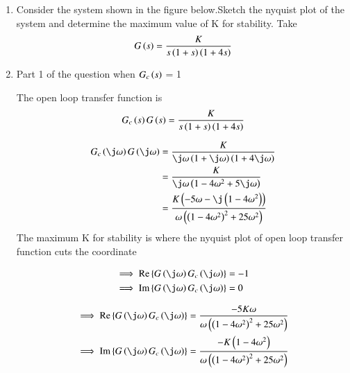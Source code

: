 \begin{enumerate}[label=\thesubsection.\arabic*.,ref=\thesubsection.\theenumi]

\item Consider the system shown in the figure below.Sketch the nyquist plot of the system and determine the maximum value of K for stability.
Take  
\begin{align}
G\brak{s} = \frac{K}{s\brak{1+s}\brak{1+4s}}
\label{eq:ee18btech11034_Gs}
\end{align}

\begin{figure}[!ht]
	\begin{center}
		
		\resizebox{\columnwidth}{!}{}
	\end{center}
\caption{}
\label{fig:ee18btech11034}
\end{figure}

\solution
\item Part 1 of the question when $G_{c}\left(s\right)$ = 1

The open loop transfer function is 
\begin{align}
    G_{c}\left(s\right)G\left(s\right) = \frac{K}{s\left(1+s\right)\left(1+4s\right)}
\end{align}

\begin{align}
    G_{c}\brak{\j\omega}G\brak{\j\omega} &= \frac{K}{{\j\omega}\brak{1+\j\omega}\brak{1+4\j\omega}}
    \\
    &= \frac{K}{{\j\omega}\brak{1-4\omega^2+5\j\omega}}
    \\
    &= \frac{K\brak{-5\omega-\j\brak{1-4\omega^2}}}{{\omega}\brak{\brak{1-4\omega^2}^2+25\omega^2}}
    \end{align}
The maximum K for stability is where the nyquist plot of open loop transfer function cuts the coordinate 


\begin{align}
 \implies    \text{Re} \cbrak{G\brak{\j \omega}G_{c}\brak{\j\omega}} &= -1
 \label{eq:ee18btech11034_eq_Re}
 \\
 \implies \text{Im} \cbrak{G\brak{\j \omega}G_{c}\brak{\j\omega}} &= 0
 \label{eq:ee18btech11034_eq_Im}
\end{align}

\begin{align}
 \implies    \text{Re} \cbrak{G\brak{\j \omega}G_{c}\brak{\j\omega}} &= \frac{-5K\omega}{{\omega}\brak{\brak{1-4\omega^2}^2+25\omega^2}}
 \label{eq:ee18btech11034_eq_1_Re}
 \\
 \implies \text{Im} \cbrak{G\brak{\j \omega}G_{c}\brak{\j\omega}} &= \frac{-K\brak{1-4\omega^2}}{{\omega}\brak{\brak{1-4\omega^2}^2+25\omega^2}}
 \label{eq:ee18btech11034_eq_1_Im}
\end{align}


\end{enumerate}
